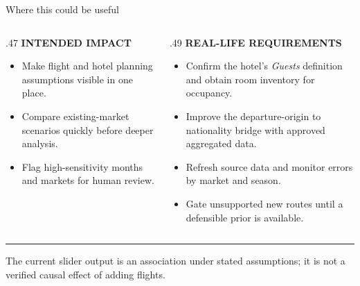 \documentclass[aspectratio=169,10pt]{beamer}
\newcommand{\kicker}[1]{{\color{Accent}\scriptsize\bfseries\MakeUppercase{#1}}\par\vspace{.16cm}}
\newcommand{\smallnote}[1]{{\color{Muted}\scriptsize #1}}
\begin{document}
\begin{frame}{Where this could be useful}
  \begin{columns}[T,totalwidth=\linewidth]
    \begin{column}{.47\linewidth}
      \kicker{Intended impact}
      \begin{itemize}\setlength\itemsep{.16cm}
        \item Make flight and hotel planning assumptions visible in one place.
        \item Compare existing-market scenarios quickly before deeper analysis.
        \item Flag high-sensitivity months and markets for human review.
      \end{itemize}
    \end{column}
    \begin{column}{.49\linewidth}
      \kicker{Real-life requirements}
      \begin{itemize}\setlength\itemsep{.16cm}
        \item Confirm the hotel's \emph{Guests} definition and obtain room inventory for occupancy.
        \item Improve the departure-origin to nationality bridge with approved aggregated data.
        \item Refresh source data and monitor errors by market and season.
        \item Gate unsupported new routes until a defensible prior is available.
      \end{itemize}
    \end{column}
  \end{columns}
  \vfill
  {\color{Rule}\rule{\linewidth}{.5pt}}\par
  \smallnote{The current slider output is an association under stated assumptions; it is not a verified causal effect of adding flights.}
\end{frame}
\end{document}
